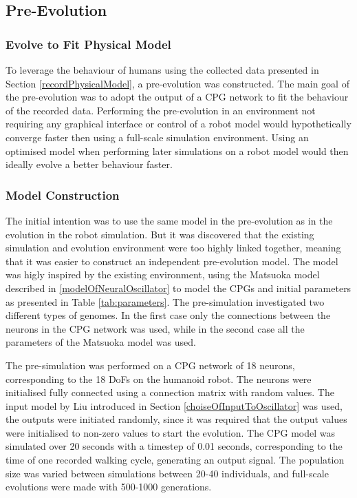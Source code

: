 


\subsection{Pre-Evolution}

\subsubsection{Evolve to Fit Physical Model}
To leverage the behaviour of humans using the collected data presented in Section \ref{recordPhysicalModel}, a pre-evolution was constructed. The main goal of the pre-evolution was to adopt the output of a CPG network to fit the behaviour of the recorded data. Performing the pre-evolution in an environment not requiring any graphical interface or control of a robot model would hypothetically converge faster then using a full-scale simulation environment. Using an optimised model when performing later simulations on a robot model would then ideally evolve a better behaviour faster.


\subsubsection{Model Construction}
The initial intention was to use the same model in the pre-evolution as in the evolution in the robot simulation. But it was discovered that the existing simulation and evolution environment were too highly linked together, meaning that it was easier to construct an independent pre-evolution model. The model was higly inspired by the existing environment, using the Matsuoka model described in \ref{modelOfNeuralOscillator} to model the CPGs and initial parameters as presented in Table \ref{tab:parameters}. The pre-simulation investigated two different types of genomes. In the first case only the connections between the neurons in the CPG network was used, while in the second case all the parameters of the Matsuoka model was used.

The pre-simulation was performed on a CPG network of 18 neurons, corresponding to the 18 DoFs on the humanoid robot. The neurons were initialised fully connected using a connection matrix with random values. The input model by Liu introduced in Section \ref{choiseOfInputToOscillator} was used, the outputs were initiated randomly, since it was required that the output values were initialised to non-zero values to start the evolution. The CPG model was simulated over 20 seconds with a timestep of 0.01 seconds, corresponding to the time of one recorded walking cycle, generating an output signal. The population size was varied between simulations between 20-40 individuals, and full-scale evolutions were made with 500-1000 generations.


